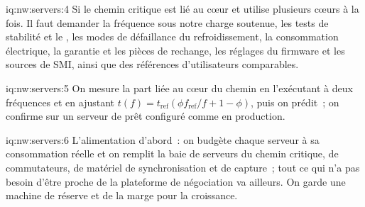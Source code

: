 \begin{solution}{iq:nw:servers:4}
Si le chemin critique est lié au cœur et utilise plusieurs cœurs à la fois. Il faut demander la fréquence sous notre charge soutenue, les tests de stabilité et le ,
les modes de défaillance du refroidissement, la consommation électrique, la garantie et les pièces de rechange, les réglages du firmware et les sources de SMI, ainsi que des références d'utilisateurs comparables.
\end{solution}

\begin{solution}{iq:nw:servers:5}
On mesure la part liée au cœur du chemin en l'exécutant à deux fréquences et en ajustant $t(f) = t_{\mathrm{ref}}(\phi f_{\mathrm{ref}}/f + 1 - \phi)$, puis
on prédit~; on confirme sur un serveur de prêt configuré comme en production.
\end{solution}

\begin{solution}{iq:nw:servers:6}
L'alimentation d'abord~: on budgète chaque serveur à sa consommation réelle et on remplit la baie de serveurs du chemin critique, de commutateurs, de matériel de synchronisation et de capture~; tout ce qui
n'a pas besoin d'être proche de la plateforme de négociation va ailleurs. On garde une machine de réserve et de la marge pour la croissance.
\end{solution}
